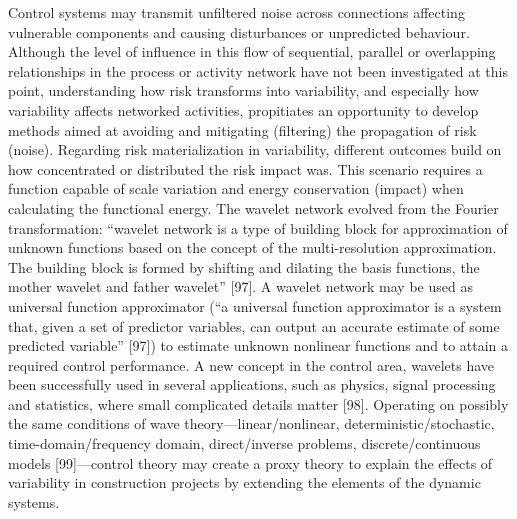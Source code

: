 \documentclass{article}
\begin{document}
\begin{itemize}
Control systems may transmit unfiltered noise across connections affecting vulnerable components and causing disturbances or unpredicted behaviour.
Although the level of influence in this flow of sequential, parallel or overlapping relationships in the process or activity network have not been investigated at this point, understanding how risk transforms into variability, and especially how variability affects networked activities, propitiates an opportunity to develop methods aimed at avoiding and mitigating (filtering) the propagation of risk (noise). Regarding risk materialization in variability, different outcomes build on how concentrated or distributed the risk impact was.
This scenario requires a function capable of scale variation and energy conservation (impact) when calculating the functional energy.
The wavelet network evolved from the Fourier transformation: “wavelet network is a type of building block for approximation of unknown functions based on the concept of the multi-resolution approximation.
The building block is formed by shifting and dilating the basis functions, the mother wavelet and father wavelet” [97].
A wavelet network may be used as universal function approximator (“a universal function approximator is a system that, given a set of predictor variables, can output an accurate estimate of some predicted variable” [97]) to estimate unknown nonlinear functions and to attain a required control performance.
A new concept in the control area, wavelets have been successfully used in several applications, such as physics, signal processing and statistics, where small complicated details matter [98].
Operating on possibly the same conditions of wave theory—linear/nonlinear, deterministic/stochastic, time-domain/frequency domain, direct/inverse problems, discrete/continuous models [99]—control theory may create a proxy theory to explain the effects of variability in construction projects by extending the elements of the dynamic systems.
\end{itemize}
\end{document}
